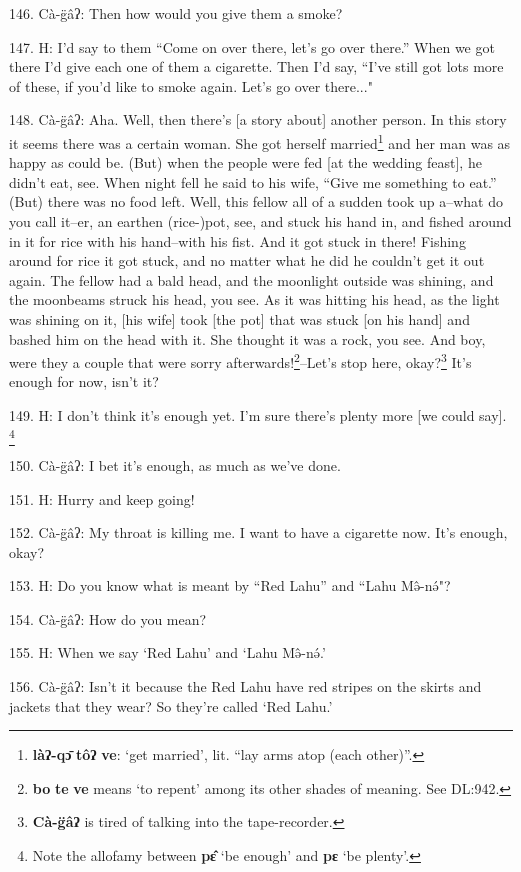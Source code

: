146. Cà-g̈âʔ: Then how would you give them a smoke?

147. H: I'd say to them ``Come on over there, let's go over there.''
When we got there I'd give each one of them a cigarette. Then I'd say, ``I've
still got lots more of these, if you'd like to smoke again. Let's go over there..."

148. Cà-g̈âʔ: Aha. Well, then there's [a story about] another person. In this
story it seems there was a certain woman. She got herself married\footnote{\textbf{làʔ-qɔ̄} \textbf{tôʔ} \textbf{ve}: `get married', lit. ``lay arms atop (each other)''.} and her
man was as happy as could be. (But) when the people were fed [at the wedding feast],
he didn't eat, see. When night fell he said to his wife, ``Give me something
to eat.'' (But) there was no food left. Well, this fellow all of a sudden
took up a--what do you call it--er, an earthen (rice-)pot, see, and stuck his hand
in, and fished around in it for rice with his hand--with his fist. And it got stuck
in there! Fishing around for rice it got stuck, and no matter what he did he couldn't
get it out again. The fellow had a bald head, and the moonlight outside was shining,
and the moonbeams struck his head, you see. As it was hitting his head, as the
light was shining on it, [his wife] took [the pot] that was stuck [on his hand]
and bashed him on the head with it. She thought it was a rock, you see. And boy,
were they a couple that were sorry afterwards!\footnote{\textbf{bo} \textbf{te} \textbf{ve} means `to repent' among its other shades of meaning. See DL:942.}--Let's stop here, okay?\footnote{\textbf{Cà-g̈âʔ} is tired of talking into the tape-recorder.}
It's enough for now, isn't it?

149. H: I don't think it's enough yet. I'm sure there's plenty more [we could say].
\footnote{Note the allofamy between \textbf{pɛ̂} `be enough' and \textbf{pɛ} `be plenty'.}

150. Cà-g̈âʔ: I bet it's enough, as much as we've done.

151. H: Hurry and keep going!

152. Cà-g̈âʔ: My throat is killing me. I want to have a cigarette now. It's
enough, okay?

153. H: Do you know what is meant by ``Red Lahu'' and ``Lahu
Mə̂-nə́"?

154. Cà-g̈âʔ: How do you mean?

155. H: When we say `Red Lahu' and `Lahu Mə̂-nə́.'

156. Cà-g̈âʔ: Isn't it because the Red Lahu have red stripes on the skirts
and jackets that they wear? So they're called `Red Lahu.'

